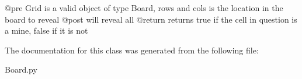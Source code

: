 \begin{DoxyVerb}@pre    Grid is a valid object of type Board, rows and cols is the location in the board to reveal
    @post   will reveal all
    @return returns true if the cell in question is a mine, false if it is not
\end{DoxyVerb}
 

The documentation for this class was generated from the following file\+:\begin{DoxyCompactItemize}
\item 
Board.\+py\end{DoxyCompactItemize}
